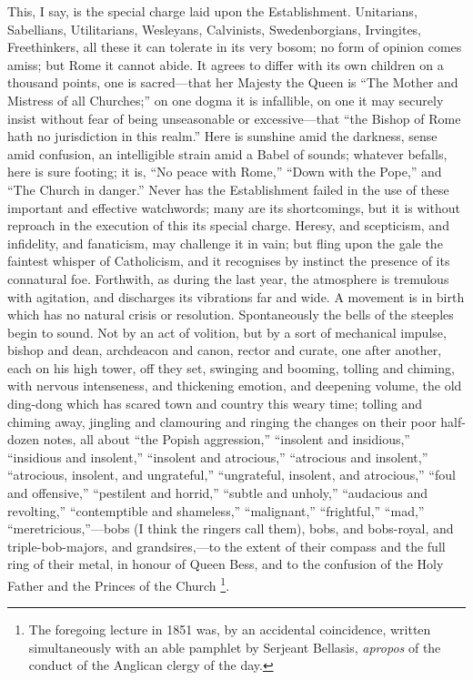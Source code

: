 This, I say, is the special charge laid upon the
Establishment. Unitarians, Sabellians, Utilitarians, Wesleyans, Calvinists, Swedenborgians, Irvingites,
Freethinkers, all these it can tolerate in its very
bosom; no form of opinion comes amiss; but Rome it cannot
abide. It agrees to differ with its own children on a
thousand points, one is sacred—that her Majesty the
Queen is ``The Mother and Mistress of all
Churches;'' on one dogma it is infallible, on one it
may securely insist without fear of being unseasonable or
excessive—that ``the Bishop of Rome hath no
jurisdiction in this realm.'' Here is sunshine amid
the darkness, sense amid confusion, an intelligible
strain amid a Babel of sounds; whatever befalls, here is
sure footing; it is, ``No peace with Rome,''
``Down with the Pope,'' and ``The Church in
danger.'' Never has the Establishment failed in the
use of these important and effective watchwords; many are
its shortcomings, but it is without reproach in the
execution of this its special charge. Heresy, and
scepticism, and infidelity, and fanaticism, may challenge
it in vain; but fling upon the gale the faintest whisper
of Catholicism, and it recognises by instinct the
presence of its connatural foe. Forthwith, as during the
last year, the atmosphere is tremulous with agitation,
and discharges its vibrations far and wide. A movement is
in birth which has no natural crisis or resolution.
Spontaneously the bells of the steeples begin to sound.
Not by an act of volition, but by a sort of mechanical
impulse, bishop and dean, archdeacon and canon, rector
and curate, one after another, each on his high tower,
off they set, swinging and booming, tolling and chiming,
with nervous intenseness, and thickening emotion, and
deepening volume, the old ding-dong which has scared town
and country this weary time; tolling and chiming away,
jingling and clamouring and ringing the changes on their
poor half-dozen notes, all about ``the Popish
aggression,'' ``insolent and insidious,''
``insidious and insolent,'' ``insolent and
atrocious,'' ``atrocious and insolent,''
``atrocious, insolent, and ungrateful,''
``ungrateful, insolent, and atrocious,''
``foul and offensive,'' ``pestilent and
horrid,'' ``subtle and unholy,''
``audacious and revolting,'' ``contemptible
and shameless,'' ``malignant,''
``frightful,'' ``mad,''
``meretricious,''—bobs (I think the ringers
call them), bobs, and bobs-royal, and triple-bob-majors,
and grandsires,—to the extent of their compass and
the full ring of their metal, in honour of Queen Bess,
and to the confusion of the Holy Father and the Princes
of the Church \footnote{The foregoing lecture in 1851
was, by an accidental coincidence, written simultaneously
with an able pamphlet by Serjeant Bellasis, \emph{apropos} of
the conduct of the Anglican clergy of the day.}.

